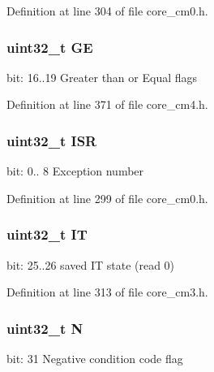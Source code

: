 Definition at line 304 of file core\+\_\+cm0.\+h.

\subsubsection[{\texorpdfstring{GE}{GE}}]{\setlength{\rightskip}{0pt plus 5cm}uint32\+\_\+t GE}\hypertarget{unionx_p_s_r___type_aa91800ec6e90e457c7a1acd1f2e17099}{}\label{unionx_p_s_r___type_aa91800ec6e90e457c7a1acd1f2e17099}
bit\+: 16..19 Greater than or Equal flags 

Definition at line 371 of file core\+\_\+cm4.\+h.

\subsubsection[{\texorpdfstring{I\+SR}{ISR}}]{\setlength{\rightskip}{0pt plus 5cm}uint32\+\_\+t I\+SR}\hypertarget{unionx_p_s_r___type_ad502ba7dbb2aab5f87c782b28f02622d}{}\label{unionx_p_s_r___type_ad502ba7dbb2aab5f87c782b28f02622d}
bit\+: 0.. 8 Exception number 

Definition at line 299 of file core\+\_\+cm0.\+h.

\subsubsection[{\texorpdfstring{IT}{IT}}]{\setlength{\rightskip}{0pt plus 5cm}uint32\+\_\+t IT}\hypertarget{unionx_p_s_r___type_a76485660fe8ad98cdc71ddd7cb0ed777}{}\label{unionx_p_s_r___type_a76485660fe8ad98cdc71ddd7cb0ed777}
bit\+: 25..26 saved IT state (read 0) 

Definition at line 313 of file core\+\_\+cm3.\+h.

\subsubsection[{\texorpdfstring{N}{N}}]{\setlength{\rightskip}{0pt plus 5cm}uint32\+\_\+t N}\hypertarget{unionx_p_s_r___type_abae0610bc2a97bbf7f689e953e0b451f}{}\label{unionx_p_s_r___type_abae0610bc2a97bbf7f689e953e0b451f}
bit\+: 31 Negative condition code flag 

